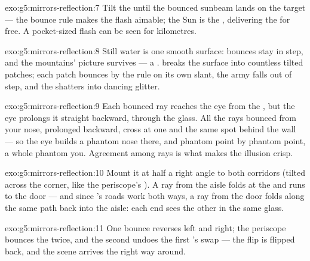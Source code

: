 \begin{solution}{exo:g5:mirrors-reflection:7}
Tilt the  until the bounced sunbeam lands on the target ---
the bounce rule makes the flash aimable; the Sun is the , delivering the  for free. A pocket-sized flash can be
seen for kilometres.
\end{solution}

\begin{solution}{exo:g5:mirrors-reflection:8}
Still water is one smooth surface: bounces stay in step, and the
mountains' picture survives --- a .  breaks the surface
into countless tilted patches; each patch bounces by the rule on
its own slant, the army falls out of step, and the  shatters
into dancing glitter.
\end{solution}

\begin{solution}{exo:g5:mirrors-reflection:9}
Each bounced ray reaches the eye from the , but the eye
prolongs it straight backward, through the glass. All the rays
bounced from your nose, prolonged backward, cross at one and the
same spot behind the wall --- so the eye builds a phantom nose
there, and phantom point by phantom point, a whole phantom you.
Agreement among rays is what makes the illusion crisp.
\end{solution}

\begin{solution}{exo:g5:mirrors-reflection:10}
Mount it at half a right angle to both corridors (tilted across the
corner, like the periscope's ). A ray from the aisle folds
at the  and runs to the door --- and since 's roads work
both ways, a ray from the door folds along the same path back into
the aisle: each end sees the other in the same glass.
\end{solution}

\begin{solution}{exo:g5:mirrors-reflection:11}
One bounce reverses left and right; the periscope bounces the 
twice, and the second  undoes the first 's swap ---
the flip is flipped back, and the scene arrives the right way
around.
\end{solution}
